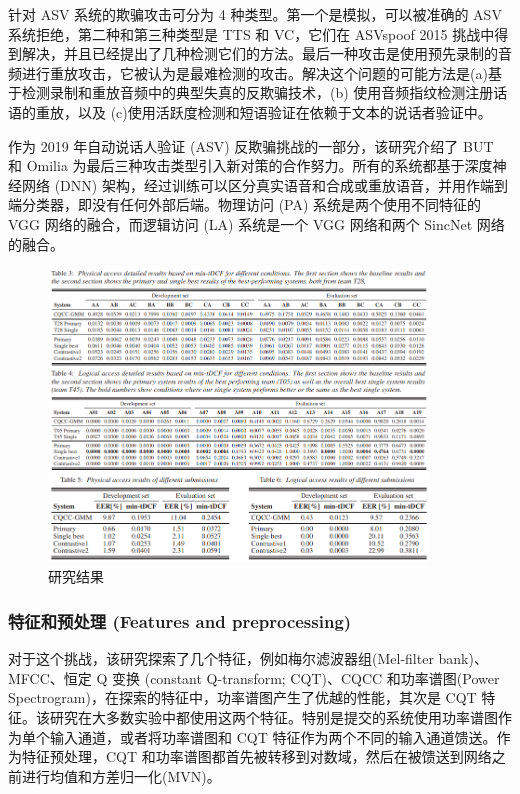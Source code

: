 针对 ASV 系统的欺骗攻击可分为 4 种类型。第一个是模拟，可以被准确的 ASV 系统拒绝，第二种和第三种类型是 TTS 和 VC，它们在 ASVspoof 2015 挑战中得到解决，并且已经提出了几种检测它们的方法。最后一种攻击是使用预先录制的音频进行重放攻击，它被认为是最难检测的攻击。解决这个问题的可能方法是(a)基于检测录制和重放音频中的典型失真的反欺骗技术，(b) 使用音频指纹检测注册话语的重放，以及 (c)使用活跃度检测和短语验证在依赖于文本的说话者验证中。

作为 2019 年自动说话人验证 (ASV) 反欺骗挑战的一部分，该研究介绍了 BUT 和 Omilia 为最后三种攻击类型引入新对策的合作努力。所有的系统都基于深度神经网络 (DNN) 架构，经过训练可以区分真实语音和合成或重放语音，并用作端到端分类器，即没有任何外部后端。物理访问 (PA) 系统是两个使用不同特征的 VGG 网络的融合，而逻辑访问 (LA) 系统是一个 VGG 网络和两个 SincNet 网络的融合。

\begin{figure}[htb]
\centering 
\includegraphics[width=0.90\textwidth]{img/p4m1.png} 
\caption{研究结果}
\label{Test}
\end{figure}

\subsubsection{特征和预处理 (Features and preprocessing)}

对于这个挑战，该研究探索了几个特征，例如梅尔滤波器组(Mel-filter bank)、MFCC、恒定 Q 变换 (constant Q-transform; CQT)、CQCC 和功率谱图(Power Spectrogram)，在探索的特征中，功率谱图产生了优越的性能，其次是 CQT 特征。该研究在大多数实验中都使用这两个特征。特别是提交的系统使用功率谱图作为单个输入通道，或者将功率谱图和 CQT 特征作为两个不同的输入通道馈送。作为特征预处理，CQT 和功率谱图都首先被转移到对数域，然后在被馈送到网络之前进行均值和方差归一化(MVN)。

